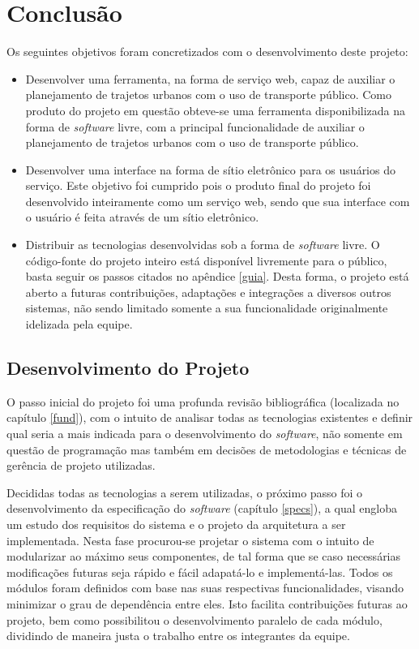 \chapter{Conclusão}
Os seguintes objetivos foram concretizados com o desenvolvimento deste projeto:

\begin{itemize}
	\item Desenvolver uma ferramenta, na forma de serviço web, capaz de auxiliar o planejamento de trajetos urbanos com o uso de transporte público.
Como produto do projeto em questão obteve-se uma ferramenta disponibilizada na forma de \emph{software} livre, com a principal funcionalidade de auxiliar o planejamento de trajetos urbanos com o uso de transporte público.
	\item Desenvolver uma interface na forma de sítio eletrônico para os usuários do serviço.
Este objetivo foi cumprido pois o produto final do projeto foi desenvolvido inteiramente como um serviço web, sendo que sua interface com o usuário é feita através de um sítio eletrônico.
	\item Distribuir as tecnologias desenvolvidas sob a forma de \emph{software} livre.
O código-fonte do projeto inteiro está disponível livremente para o público, basta seguir os passos citados no apêndice \ref{guia}.
Desta forma, o projeto está aberto a futuras contribuições, adaptações e integrações a diversos outros sistemas, não sendo limitado somente a sua funcionalidade originalmente idelizada pela equipe.
\end{itemize}

\section{Desenvolvimento do Projeto}
O passo inicial do projeto foi uma profunda revisão bibliográfica (localizada no capítulo \ref{fund}), com o intuito de analisar todas as tecnologias existentes e definir qual seria a mais indicada para o desenvolvimento do \emph{software}, não somente em questão de programação mas também em decisões de metodologias e técnicas de gerência de projeto utilizadas.

Decididas todas as tecnologias a serem utilizadas, o próximo passo foi o desenvolvimento da especificação do \emph{software} (capítulo \ref{specs}), a qual engloba um estudo dos requisitos do sistema e o projeto da arquitetura a ser implementada.
Nesta fase procurou-se projetar o sistema com o intuito de modularizar ao máximo seus componentes, de tal forma que se caso necessárias modificações futuras seja rápido e fácil adapatá-lo e implementá-las.
Todos os módulos foram definidos com base nas suas respectivas funcionalidades, visando minimizar o grau de dependência entre eles. 
Isto facilita contribuições futuras ao projeto, bem como possibilitou o desenvolvimento paralelo de cada módulo, dividindo de maneira justa o trabalho entre os integrantes da equipe.

